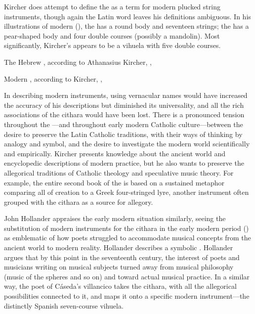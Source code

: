 Kircher does attempt to define the  as a term for modern
plucked string instruments, though again the Latin word leaves his definitions
ambiguous.
In his illustrations of modern 
(), the  has a round body and
seventeen strings; the  has a pear-shaped
body and four double courses (possibly a mandolin).
Most significantly, Kircher's  appears to be a vihuela
with five double courses.

{The Hebrew , according to Athanasius Kircher, , }

{Modern , according to Kircher, ,
}

In describing modern instruments, using vernacular names would have increased
the accuracy of his descriptions but diminished its universality, and all the
rich associations of the cithara would have been lost.
There is a pronounced tension throughout the ---and throughout
early modern Catholic culture---between the desire to preserve the Latin
Catholic traditions, with their ways of thinking by analogy and symbol, and the
desire to investigate the modern world scientifically and empirically.
Kircher presents  knowledge about the ancient world and
encyclopedic descriptions of modern practice, but he also wants to preserve the
allegorical traditions of Catholic theology and speculative music theory.
For example, the entire second book of the  is based on a
sustained metaphor comparing all of creation to a Greek four-stringed lyre,
another instrument often grouped with the cithara as a source for allegory.

John Hollander appraises the early modern situation similarly, seeing the
substitution of modern instruments for the cithara in the early modern period
() as emblematic of how poets struggled to accommodate
musical concepts from the ancient world to modern reality.
Hollander describes a symbolic .%
    \Autocite[44--51]{Hollander:Untuning}
Hollander argues that by this point in the seventeenth century, the interest of
poets and musicians writing on musical subjects turned away from musical
philosophy (music of the spheres and so on) and toward actual musical practice. 
In a similar way, the poet of Cáseda's villancico takes the cithara, with all
the allegorical possibilities connected to it, and maps it onto a specific
modern instrument---the distinctly Spanish seven-course vihuela.

